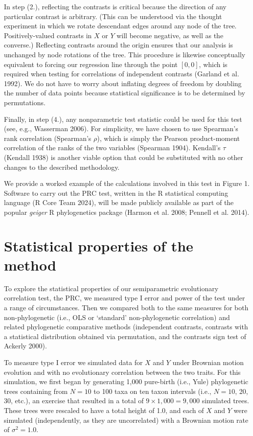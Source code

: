 \documentclass[fleqn,10pt,lineno]{wlpeerj} %
\begin{document}
In step (2.), reflecting the contrasts is critical because the direction of any particular contrast is arbitrary. (This can be understood via the thought experiment in which we rotate descendant edges around any node of the tree. Positively-valued contrasts in \(X\) or \(Y\) will become negative, as well as the converse.) Reflecting contrasts around the origin ensures that our analysis is unchanged by node rotations of the tree. This procedure is likewise conceptually equivalent to forcing our regression line through the point \([0,0]\), which is required when testing for correlations of independent contrasts (Garland et al. 1992). We do not have to worry about inflating degrees of freedom by doubling the number of data points because statistical significance is to be determined by permutations.

Finally, in step (4.), any nonparametric test statistic could be used for this test (see, e.g., Wasserman 2006). For simplicity, we have chosen to use Spearman's rank correlation (Spearman's \(\rho\)), which is simply the Pearson product-moment correlation of the ranks of the two variables (Spearman 1904). Kendall's \(\tau\) (Kendall 1938) is another viable option that could be substituted with no other changes to the described methodology.

We provide a worked example of the calculations involved in this test in Figure 1. Software to carry out the PRC test, written in the R statistical computing language (R Core Team 2024), will be made publicly available as part of the popular \emph{geiger} R phylogenetics package (Harmon et al. 2008; Pennell et al. 2014).

\section{Statistical properties of the method}\label{statistical-properties-of-the-method}

To explore the statistical properties of our semiparametric evolutionary correlation test, the PRC, we measured type I error and power of the test under a range of circumstances. Then we compared both to the same measures for both non-phylogenetic (i.e., OLS or `standard' non-phylogenetic correlation) and related phylogenetic comparative methods (independent contrasts, contrasts with a statistical distribution obtained via permutation, and the contrasts sign test of Ackerly 2000).

To measure type I error we simulated data for \(X\) and \(Y\) under Brownian motion evolution and with no evolutionary correlation between the two traits. For this simulation, we first began by generating 1,000 pure-birth (i.e., Yule) phylogenetic trees containing from \(N=10\) to 100 taxa on ten taxon intervals (i.e., \(N=10\), 20, 30, etc.), an exercise that resulted in a total of \(9 \times 1,000 = 9,000\) simulated trees. These trees were rescaled to have a total height of 1.0, and each of \(X\) and \(Y\) were simulated (independently, as they are uncorrelated) with a Brownian motion rate of \(\sigma^2 = 1.0\).
\end{document}
